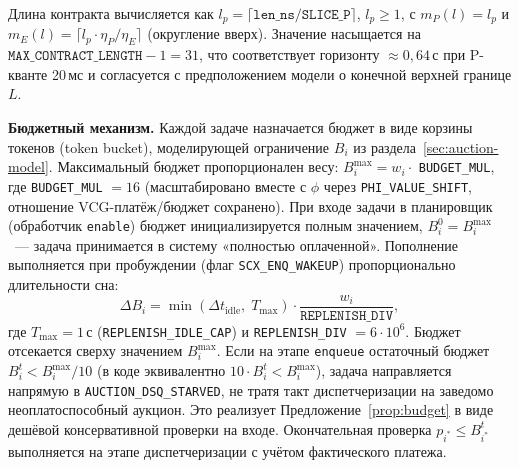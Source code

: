 \documentclass[14pt, oneside]{extbook}
\begin{document}
        Длина контракта вычисляется как $l_p = \lceil
        \texttt{len\_ns} / \texttt{SLICE\_P} \rceil$, $l_p \geq 1$,
        с $m_P(l) = l_p$ и $m_E(l) = \lceil l_p \cdot \eta_P /
        \eta_E \rceil$ (округление вверх). Значение
        насыщается на $\texttt{MAX\_CONTRACT\_LENGTH} - 1 = 31$,
        что соответствует горизонту $\approx 0{,}64$\,с при
        P-кванте 20\,мс и согласуется с
        предположением модели о конечной верхней границе $L$.

        \textbf{Бюджетный механизм.}\label{para:budget}
        Каждой задаче назначается бюджет в виде корзины токенов
        (token bucket), моделирующей ограничение $B_i$ из
        раздела~\ref{sec:auction-model}. Максимальный бюджет
        пропорционален весу: $B_i^{\max} = w_i \cdot$
        \texttt{BUDGET\_MUL}, где \texttt{BUDGET\_MUL} $= 16$
        (масштабировано вместе с $\phi$ через
        \texttt{PHI\_VALUE\_SHIFT}, отношение VCG-платёж/бюджет
        сохранено).
        При входе задачи в планировщик (обработчик
        \texttt{enable}) бюджет инициализируется полным
        значением, $B_i^0 = B_i^{\max}$~--- задача принимается
        в систему «полностью оплаченной». Пополнение
        выполняется при пробуждении (флаг
        \texttt{SCX\_ENQ\_WAKEUP}) пропорционально длительности
        сна:
        \[
                \Delta B_i = \min(\Delta t_{\mathrm{idle}},\;
                T_{\max}) \cdot \frac{w_i}{\texttt{REPLENISH\_DIV}},
        \]
        где $T_{\max} = 1$\,с (\texttt{REPLENISH\_IDLE\_CAP}) и
        \texttt{REPLENISH\_DIV} $= 6 \cdot 10^6$. Бюджет
        отсекается сверху значением $B_i^{\max}$. Если на
        этапе \texttt{enqueue} остаточный бюджет
        $B_i^t < B_i^{\max} / 10$ (в коде эквивалентно
        $10 \cdot B_i^t < B_i^{\max}$), задача направляется
        напрямую в \texttt{AUCTION\_DSQ\_STARVED}, не тратя такт
        диспетчеризации на заведомо неоплатоспособный аукцион.
        Это реализует Предложение~\ref{prop:budget} в виде
        дешёвой консервативной проверки на входе. Окончательная
        проверка $p_{i^*} \leq B_{i^*}^t$ выполняется на этапе
        диспетчеризации с учётом фактического платежа.
\end{document}
